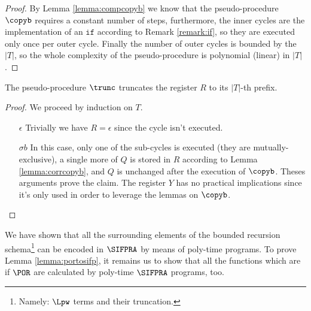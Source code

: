 \begin{proof}
By Lemma \ref{lemma:compcopyb} we know that the pseudo-procedure $\copyb$ requires a constant number of steps, furthermore, the inner cycles are the implementation of an $\mathtt{if}$ according to Remark \ref{remark:if}, so they are executed only once per outer cycle. Finally the number of outer cycles is bounded by the $|T|$, so the whole complexity of the pseudo-procedure is polynomial (linear) in $|T|$.
\end{proof}

\begin{lemma}
\label{lemma:corrtrunc}
The pseudo-procedure $\trunc$ truncates the register $R$ to its $|T|$-th prefix.
\end{lemma}

\begin{proof}
We proceed by induction on $T$.
\begin{itemize}
\item[$\epsilon$] Trivially we have $R=\epsilon$ since the cycle isn't executed.
\item[$\sigma b$] In this case, only one of the sub-cycles is executed (they are mutually-exclusive), a single more of $Q$ is stored in $R$ according to Lemma \ref{lemma:corrcopyb}, and $Q$ is unchanged after the execution of $\copyb$. Theses arguments prove the claim. The register $Y$ has no practical implications since it's only used in order to leverage the lemmas on $\copyb$.
\end{itemize}
\end{proof}

We have shown that all the surrounding elements of the bounded recursion schema\footnote{Namely: $\Lpw$ terms and their truncation.}
can be encoded in $\SIFPRA$ by means of poly-time programs.
To prove Lemma \ref{lemma:portosifp}, it remains us to show
that all the functions which are if $\POR$ are calculated by poly-time $\SIFPRA$
programs, too.

